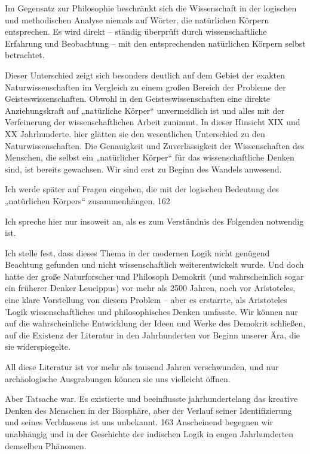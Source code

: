 \documentclass[11pt,a4paper]{book}
\begin{document}
Im Gegensatz zur Philosophie beschränkt sich die Wissenschaft in der logischen und methodischen Analyse niemals auf Wörter, die natürlichen Körpern entsprechen. Es wird direkt -- ständig überprüft durch wissenschaftliche Erfahrung und Beobachtung -- mit den entsprechenden natürlichen Körpern selbst betrachtet.



Dieser Unterschied zeigt sich besonders deutlich auf dem Gebiet der exakten Naturwissenschaften im Vergleich zu einem großen Bereich der Probleme der Geisteswissenschaften. Obwohl in den Geisteswissenschaften eine direkte Anziehungskraft auf „natürliche Körper“ unvermeidlich ist und alles mit der Verfeinerung der wissenschaftlichen Arbeit zunimmt. In dieser Hinsicht XIX und XX Jahrhunderte. hier glätten sie den wesentlichen Unterschied zu den Naturwissenschaften. Die Genauigkeit und Zuverlässigkeit der Wissenschaften des Menschen, die selbst ein „natürlicher Körper“ für das wissenschaftliche Denken sind, ist bereits gewachsen. Wir sind erst zu Beginn des Wandels anwesend.



Ich werde später auf Fragen eingehen, die mit der logischen Bedeutung des „natürlichen Körpers“ zusammenhängen. 162



Ich spreche hier nur insoweit an, als es zum Verständnis des Folgenden notwendig ist.



Ich stelle fest, dass dieses Thema in der modernen Logik nicht genügend Beachtung gefunden und nicht wissenschaftlich weiterentwickelt wurde. Und doch hatte der große Naturforscher und Philosoph Demokrit (und wahrscheinlich sogar ein früherer Denker Leucippus) vor mehr als 2500 Jahren, noch vor Aristoteles, eine klare Vorstellung von diesem Problem -- aber es erstarrte, als Aristoteles 'Logik wissenschaftliches und philosophisches Denken umfasste. Wir können nur auf die wahrscheinliche Entwicklung der Ideen und Werke des Demokrit schließen, auf die Existenz der Literatur in den Jahrhunderten vor Beginn unserer Ära, die sie widerspiegelte.



All diese Literatur ist vor mehr als tausend Jahren verschwunden, und nur archäologische Ausgrabungen können sie uns vielleicht öffnen.



Aber Tatsache war. Es existierte und beeinflusste jahrhundertelang das kreative Denken des Menschen in der Biosphäre, aber der Verlauf seiner Identifizierung und seines Verblassens ist uns unbekannt. 163 Anscheinend begegnen wir unabhängig und in der Geschichte der indischen Logik in engen Jahrhunderten demselben Phänomen.
\end{document}
